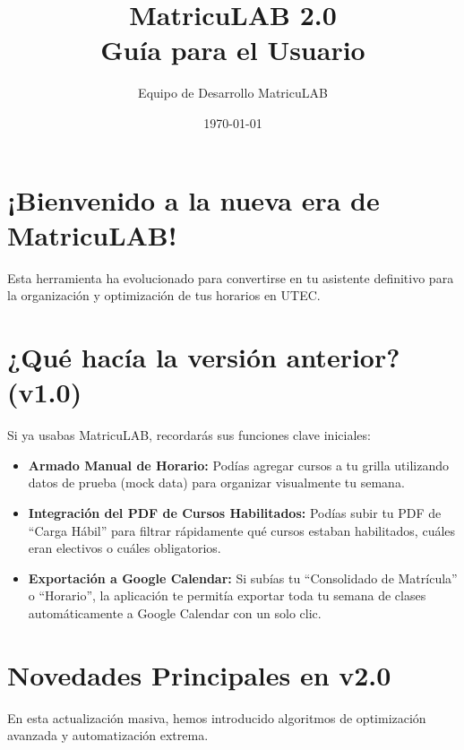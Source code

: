 \documentclass[12pt,a4paper]{article}
\title{\textbf{MatricuLAB 2.0} \\ \Large Guía para el Usuario}
\author{Equipo de Desarrollo MatricuLAB}
\date{\today}
\begin{document}
\maketitle

\section*{¡Bienvenido a la nueva era de MatricuLAB!}
Esta herramienta ha evolucionado para convertirse en tu asistente definitivo para la organización y optimización de tus horarios en UTEC.

\section{¿Qué hacía la versión anterior? (v1.0)}
Si ya usabas MatricuLAB, recordarás sus funciones clave iniciales:
\begin{itemize}[label=\textcolor{blue}{\textbullet}]
    \item \textbf{Armado Manual de Horario:} Podías agregar cursos a tu grilla utilizando datos de prueba (mock data) para organizar visualmente tu semana.
    \item \textbf{Integración del PDF de Cursos Habilitados:} Podías subir tu PDF de ``Carga Hábil'' para filtrar rápidamente qué cursos estaban habilitados, cuáles eran electivos o cuáles obligatorios.
    \item \textbf{Exportación a Google Calendar:} Si subías tu ``Consolidado de Matrícula'' o ``Horario'', la aplicación te permitía exportar toda tu semana de clases automáticamente a Google Calendar con un solo clic.
\end{itemize}

\section{Novedades Principales en v2.0}
En esta actualización masiva, hemos introducido algoritmos de optimización avanzada y automatización extrema.
\end{document}
